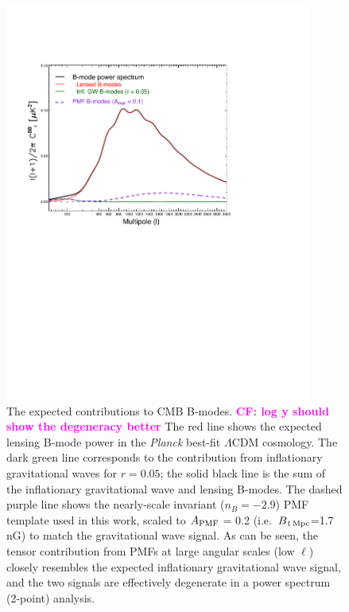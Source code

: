 \documentclass[apj]{emulateapj}
\newcommand{\apmf}{\ensuremath{A_{\rm PMF}}}
\newcommand{\bpmf}{\ensuremath{B_{\rm 1\,Mpc}}}
\newcommand{\lcdm}{\ensuremath{\Lambda}CDM}
\newcommand{\planck}{{\sl Planck}}
\begin{document}
\begin{figure}[htb]\centering
\includegraphics[width=0.9\textwidth,clip,trim={1.5cm 12.cm 5cm 4cm}]{pmf_templates.pdf}
  \caption[CMB polarization from PMFs]{
  The expected contributions to CMB B-modes. \textbf{\textcolor{magenta}{CF: log y should show the degeneracy better}}
  The red line shows the expected lensing B-mode power in the \planck{} best-fit \lcdm{} cosmology. 
  The dark green line corresponds to the contribution from inflationary gravitational waves for $r=0.05$; the solid black line is the sum of the inflationary gravitational wave and lensing B-modes. 
  The dashed purple line shows the nearly-scale invariant ($n_B=-2.9$) PMF template used in this work, scaled to \apmf{} = 0.2 (i.e.~\bpmf{}=1.7\,nG) to match the gravitational wave signal. 
  As can be seen, the tensor contribution from PMFs at large angular scales (low $\ell$) closely resembles the expected inflationary gravitational wave signal, and the two signals are effectively degenerate in a power spectrum (2-point) analysis.
      \label{fig:pmf-bb}
  }
\end{figure}
\end{document}

